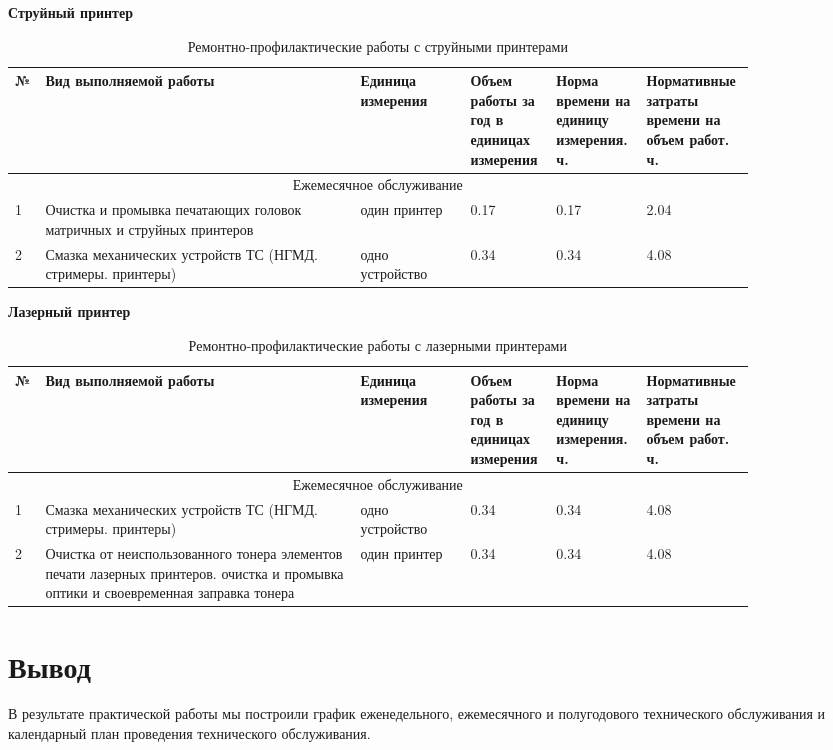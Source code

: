 \documentclass[a4paper,14pt]{extarticle}
\begin{document}
\textbf{Струйный принтер}
\begin{table}[htbp]
	\scriptsize
	\caption{Ремонтно-профилактические работы с струйными принтерами}
	\begin{tabular}{|m{0.02\linewidth}|m{0.4\linewidth}|m{0.14\linewidth}|m{0.1\linewidth}|m{0.1\linewidth}|m{0.1\linewidth}|}
		\hline
		№ & Вид выполняемой работы & Единица измерения & Объем работы за год в единицах измерения & Норма времени на единицу измерения. ч.& Нормативные затраты времени на объем работ. ч. \\\hline
		
		\multicolumn{6}{|c|}{Ежемесячное обслуживание} \\ \hline
		
		1	&Очистка и промывка печатающих головок матричных и струйных принтеров&	один принтер&	0.17&	0.17	&2.04\\ \hline
		2&	Смазка механических устройств ТС (НГМД. стримеры. принтеры)	&одно устройство&	0.34&	0.34&	4.08\\ \hline
	\end{tabular}
	\label{}
\end{table}

\textbf{Лазерный принтер}
\begin{table}[htbp]
	\scriptsize
	\caption{Ремонтно-профилактические работы с лазерными принтерами}
	\begin{tabular}{|m{0.02\linewidth}|m{0.4\linewidth}|m{0.14\linewidth}|m{0.1\linewidth}|m{0.1\linewidth}|m{0.1\linewidth}|}
		\hline
		№ & Вид выполняемой работы & Единица измерения & Объем работы за год в единицах измерения & Норма времени на единицу измерения. ч.& Нормативные затраты времени на объем работ. ч. \\\hline
		
		\multicolumn{6}{|c|}{Ежемесячное обслуживание} \\ \hline
		
		1	&Смазка механических устройств ТС (НГМД. стримеры. принтеры)&	одно устройство	&0.34&	0.34&	4.08\\ \hline
		2	&	Очистка от неиспользованного тонера элементов печати лазерных принтеров. очистка и промывка оптики и своевременная заправка тонера&	один принтер&	0.34&	0.34&	4.08\\ \hline
		
	\end{tabular}
	\label{}
\end{table}






\newpage
\section*{Вывод}
В результате практической работы мы построили график еженедельного, ежемесячного и полугодового технического обслуживания и календарный план проведения технического обслуживания.





\normalsize
\end{document}
